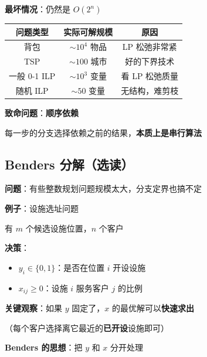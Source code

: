 \documentclass[12pt, a4paper]{ctexart}
\begin{document}
\begin{blackboard}[分支定界的局限性]

\textbf{最坏情况}：仍然是 $O(2^n)$

\begin{center}
\begin{tabular}{c|c|c}
问题类型 & 实际可解规模 & 原因 \\
\hline
背包 & $\sim 10^4$ 物品 & LP 松弛非常紧 \\
TSP & $\sim 100$ 城市 & 好的下界技术 \\
一般 0-1 ILP & $\sim 10^3$ 变量 & 看 LP 松弛质量 \\
随机 ILP & $\sim 50$ 变量 & 无结构，难剪枝
\end{tabular}
\end{center}

\textbf{致命问题}：\textbf{顺序依赖}

每一步的分支选择依赖之前的结果，\textbf{本质上是串行算法}

\end{blackboard}

\subsection{Benders 分解（选读）}

\begin{blackboard}

\textbf{问题}：有些整数规划问题规模太大，分支定界也搞不定

\textbf{例子}：设施选址问题

有 $m$ 个候选设施位置，$n$ 个客户

\textbf{决策}：
\begin{itemize}
    \item $y_i \in \{0, 1\}$：是否在位置 $i$ 开设设施
    \item $x_{ij} \geq 0$：设施 $i$ 服务客户 $j$ 的比例
\end{itemize}

\textbf{关键观察}：如果 $y$ 固定了，$x$ 的最优解可以\textbf{快速求出}

（每个客户选择离它最近的\textbf{已开设}设施即可）

\textbf{Benders 的思想}：把 $y$ 和 $x$ 分开处理

\end{blackboard}
\end{document}
